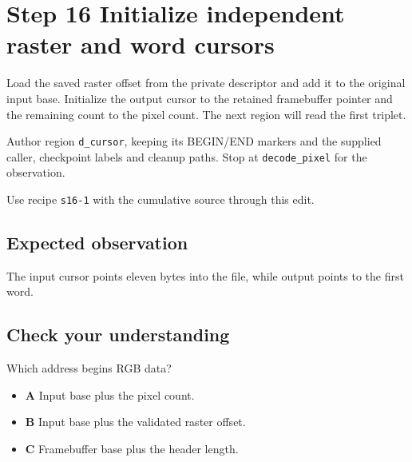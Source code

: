 \section{Step 16 Initialize independent raster and word cursors}\label{ppm-s16}

Load the saved raster offset from the private descriptor and add it to the original input base. Initialize the output cursor to the retained framebuffer pointer and the remaining count to the pixel count. The next region will read the first triplet.

Author region \texttt{d\_cursor}, keeping its BEGIN/END markers and the supplied caller, checkpoint labels and cleanup paths. Stop at \texttt{decode\_pixel} for the observation.

Use recipe \texttt{s16-1} with the cumulative source through this edit.

\subsection{Expected observation}
The input cursor points eleven bytes into the file, while output points to the first word.

\subsection{Check your understanding}
Which address begins RGB data?

\begin{itemize}
  \item \textbf{A} Input base plus the pixel count.
  \item \textbf{B} Input base plus the validated raster offset.
  \item \textbf{C} Framebuffer base plus the header length.
\end{itemize}
